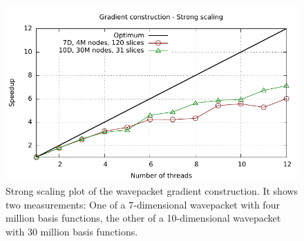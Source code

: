 \documentclass{article}
\begin{document}
\begin{figure}[H]
  \centering
  \includegraphics[width=1.0\textwidth]{plots/grad_eval_omp}
  \caption{
    Strong scaling plot of the wavepacket gradient construction.
    It shows two measurements: One of a 7-dimensional wavepacket with
    four million basis functions, the other of a 10-dimensional wavepacket with
    30 million basis functions.
  }
  \label{fig:grad_eval_omp}
\end{figure}



\end{document}
